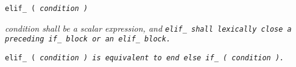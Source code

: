 
\tt{elif_ (} \it{condition} \tt{)}


\it{condition} shall be a scalar expression, and \tt{elif_} shall
lexically close a preceding \tt{if_} block or an \tt{elif_} block.


\tt{elif_ (} \it{condition} \tt{)} is equivalent to
\tt{end else if_ (} \it{condition} \tt{)}.
